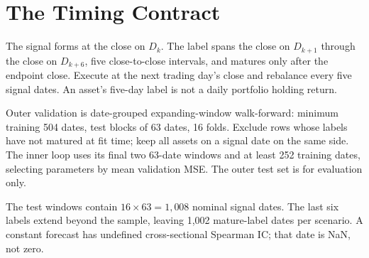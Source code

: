 \clearpage\section{The Timing Contract}
\begin{strand}
The signal forms at the close on \(D_k\). The label spans the close on \(D_{k+1}\) through the close on \(D_{k+6}\), five close-to-close intervals, and matures only after the endpoint close. Execute at the next trading day's close and rebalance every five signal dates. An asset’s five-day label is not a daily portfolio holding return.
\end{strand}
\begin{proposition}
Outer validation is date-grouped expanding-window walk-forward: minimum training 504 dates, test blocks of 63 dates, 16 folds. Exclude rows whose labels have not matured at fit time; keep all assets on a signal date on the same side. The inner loop uses its final two 63-date windows and at least 252 training dates, selecting parameters by mean validation MSE. The outer test set is for evaluation only.
\end{proposition}
The test windows contain \(16\times63=1,008\) nominal signal dates. The last six labels extend beyond the sample, leaving 1,002 mature-label dates per scenario. A constant forecast has undefined cross-sectional Spearman IC; that date is NaN, not zero.

